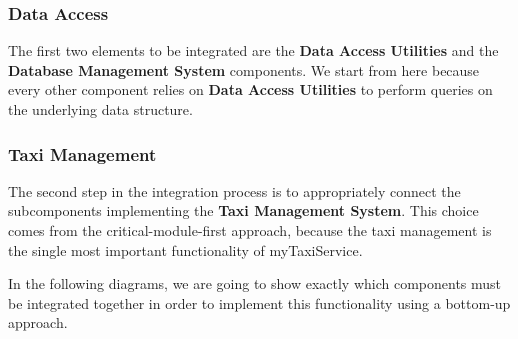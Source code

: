 \subsubsection*{Data Access}
The first two elements to be integrated are the \textbf{Data Access Utilities} and the \textbf{Database Management System} components. We start from here because every other component relies on \textbf{Data Access Utilities} to perform queries on the underlying data structure. 
\begin{figure}[H]
\centering
{}
\end{figure}
\subsubsection*{Taxi Management}
The second step in the integration process is to appropriately connect the subcomponents implementing the \textbf{Taxi Management System}. This choice comes from the critical-module-first approach, because the taxi management is the single most important functionality of myTaxiService.

In the following diagrams, we are going to show exactly which components must be integrated together in order to implement this functionality using a bottom-up approach.

